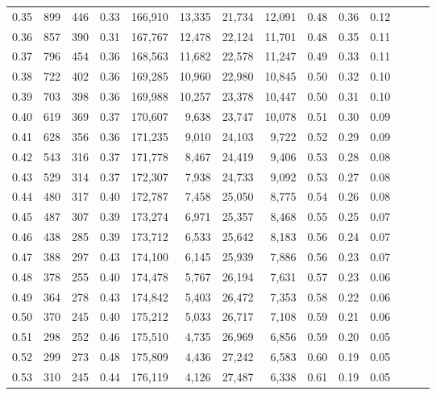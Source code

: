 \begin{tabular}{rrrrrrrrrrrrrr}
0.35 &     899 &  446 &  0.33 &  166,910 &   13,335 &  21,734 &  12,091 &  0.48 &  0.36 &      0.12 \\
0.36 &     857 &  390 &  0.31 &  167,767 &   12,478 &  22,124 &  11,701 &  0.48 &  0.35 &      0.11 \\
0.37 &     796 &  454 &  0.36 &  168,563 &   11,682 &  22,578 &  11,247 &  0.49 &  0.33 &      0.11 \\
0.38 &     722 &  402 &  0.36 &  169,285 &   10,960 &  22,980 &  10,845 &  0.50 &  0.32 &      0.10 \\
0.39 &     703 &  398 &  0.36 &  169,988 &   10,257 &  23,378 &  10,447 &  0.50 &  0.31 &      0.10 \\
0.40 &     619 &  369 &  0.37 &  170,607 &    9,638 &  23,747 &  10,078 &  0.51 &  0.30 &      0.09 \\
0.41 &     628 &  356 &  0.36 &  171,235 &    9,010 &  24,103 &   9,722 &  0.52 &  0.29 &      0.09 \\
0.42 &     543 &  316 &  0.37 &  171,778 &    8,467 &  24,419 &   9,406 &  0.53 &  0.28 &      0.08 \\
0.43 &     529 &  314 &  0.37 &  172,307 &    7,938 &  24,733 &   9,092 &  0.53 &  0.27 &      0.08 \\
0.44 &     480 &  317 &  0.40 &  172,787 &    7,458 &  25,050 &   8,775 &  0.54 &  0.26 &      0.08 \\
0.45 &     487 &  307 &  0.39 &  173,274 &    6,971 &  25,357 &   8,468 &  0.55 &  0.25 &      0.07 \\
0.46 &     438 &  285 &  0.39 &  173,712 &    6,533 &  25,642 &   8,183 &  0.56 &  0.24 &      0.07 \\
0.47 &     388 &  297 &  0.43 &  174,100 &    6,145 &  25,939 &   7,886 &  0.56 &  0.23 &      0.07 \\
0.48 &     378 &  255 &  0.40 &  174,478 &    5,767 &  26,194 &   7,631 &  0.57 &  0.23 &      0.06 \\
0.49 &     364 &  278 &  0.43 &  174,842 &    5,403 &  26,472 &   7,353 &  0.58 &  0.22 &      0.06 \\
0.50 &     370 &  245 &  0.40 &  175,212 &    5,033 &  26,717 &   7,108 &  0.59 &  0.21 &      0.06 \\
0.51 &     298 &  252 &  0.46 &  175,510 &    4,735 &  26,969 &   6,856 &  0.59 &  0.20 &      0.05 \\
0.52 &     299 &  273 &  0.48 &  175,809 &    4,436 &  27,242 &   6,583 &  0.60 &  0.19 &      0.05 \\
0.53 &     310 &  245 &  0.44 &  176,119 &    4,126 &  27,487 &   6,338 &  0.61 &  0.19 &      0.05 \\

\end{tabular}
